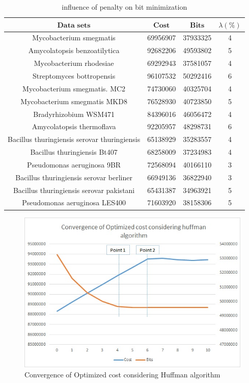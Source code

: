 \documentclass[preprint,12pt]{elsarticle}
\begin{document}
\begin{table}
\small
\label{datas}
\caption{influence of penalty on bit minimization}
\begin{center}
\begin{tabular}{c c c c }
\toprule
$\textbf{Data sets}$ & $\textbf{Cost}$	& $\textbf{Bits}$ &		\textbf{$\lambda (\%)$} \\\hline
Mycobacterium smegmatis &	69956907	&37933325 &4\\\hline
Amycolatopsis benzoatilytica &	92682206	&49593802 &5\\\hline
Mycobacterium rhodesiae&	69292943	&37581057 &4\\\hline
Streptomyces bottropensis&	96107532	&50292416 &6\\\hline
Mycobacterium smegmatis. MC2&	74730060	&40325704 &4\\\hline
Mycobacterium smegmatis MKD8&	76528930	&40723850 &5\\\hline
Bradyrhizobium WSM471&	84396016	&46056472 &4\\\hline
Amycolatopsis thermoflava&	92205957	&48298731 &6\\\hline
Bacillus thuringiensis serovar thuringiensis&	65138929	&35283557 &4\\\hline
Bacillus thuringiensis Bt407&	68258009	&37234983 &4\\\hline
Pseudomonas aeruginosa 9BR&	72568094	&40166110 &3\\\hline
Bacillus thuringiensis serovar berliner&	66949136	&36822940 &3\\\hline
Bacillus thuringiensis serovar pakistani&	65431387	&34963921 &5\\\hline
Pseudomonas aeruginosa LES400&	71603920	&38158306 &5\\\hline

\bottomrule
\end{tabular}
\end{center}
\end{table}



\begin{figure}[h]
\begin{center}
\includegraphics{Images/Drawing4.jpg}
\caption{Convergence of Optimized cost considering Huffman algorithm}
\end{center}
\label{Fig5}
\end{figure}
\end{document}
